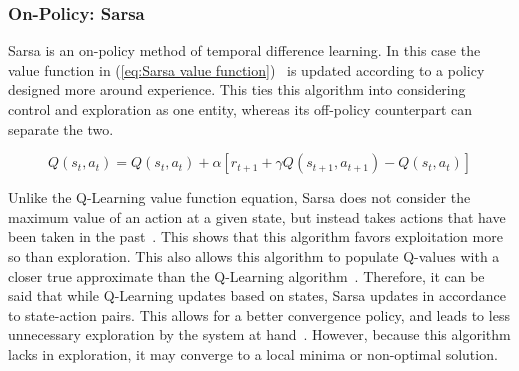 \documentclass[12pt,american]{report}
\begin{document}
        \subsubsection{On-Policy: Sarsa}
        Sarsa is an on-policy method of temporal difference learning. In this case the value function in (\ref{eq:Sarsa value function})~\cite{sprague2003multiple} is updated according to a policy designed more around experience.  This ties this algorithm into considering control and exploration as one entity, whereas its off-policy counterpart can separate the two.

        \begin{equation}
            \label{eq:Sarsa value function}
            Q(s_{t},a_{t}) = Q(s_{t},a_{t}) + \alpha[r_{t+1} + \gamma Q(s_{t+1},a_{t+1})-Q(s_{t},a_{t})]
        \end{equation}

        Unlike the Q-Learning value function equation, Sarsa does not consider the maximum value of an action at a given state, but instead takes actions that have been taken in the past~\cite{Eden}. This shows that this algorithm favors exploitation more so than exploration. This also allows this algorithm to populate Q-values with a closer true approximate than the Q-Learning algorithm~\cite{sprague2003multiple}. Therefore, it can be said that while Q-Learning updates based on states, Sarsa updates in accordance to state-action pairs.  This allows for a better convergence policy, and leads to less unnecessary exploration by the system at hand~\cite{sutton1996generalization}.  However, because this algorithm lacks in exploration, it may converge to a local minima or non-optimal solution.
\end{document}
